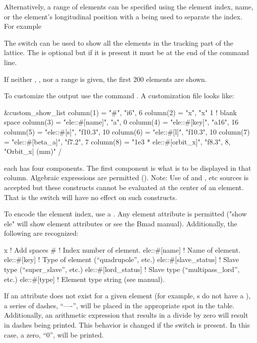 {{{\begin{description}
Alternatively, a range of elements can be specified using the element
index, name, or the element's longitudinal position with a  being
used to separate the index. For example
The  switch can be used to show all the elements
in the tracking part of the lattice. The
 is optional but if it is present it must be at the
end of the command line.

If neither , , nor a range is given,
the first 200 elements are shown.

To customize the output use the command . A customization file looks like:
\begin{example}
  &custom_show_list
    column(1) = "#",                     "i6",     6 
    column(2) = "x",                     "x"       1       ! blank space
    column(3) = "ele::#[name]",          "a",      0
    column(4) = "ele::#[key]",           "a16",   16
    column(5) = "ele::#[s]",             "f10.3", 10
    column(6) = "ele::#[l]",             "f10.3", 10
    column(7) = "ele::#[beta_a]",        "f7.2",   7
    column(8) = "1e3 * ele::#[orbit_x]", "f8.3",   8, "Orbit_x| (mm)" 
  /
\end{example}
each  has four components. The first component is what
is to be displayed in that column. Algebraic expressions are permitted
(). Note: Use of  and , etc
sources is accepted but these constructs cannot be evaluated at the
center of an element. That is the  switch will have no
effect on such constructs.

To encode the element index, use a \vn{\#}.
Any element attribute is permitted ("show ele" will show element
attributes or see the Bmad manual). Additionally, the following are
recognized:
\begin{example}
  x                          ! Add spaces
  #                          ! Index number of element.
  ele::#[name]                ! Name of element.
  ele::#[key]                 ! Type of element (``quadrupole'', etc.)
  ele::#[slave_status]        ! Slave type (``super_slave'', etc.)
  ele::#[lord_status]         ! Slave type (``multipass_lord'', etc.)
  ele::#[type]                ! Element type string (see \bmad manual).
\end{example}
If an attribute does not exist for a given element (for example,
s do not have a ), a series of dashes,
``----'', will be placed in the appropriate spot in the table.
Additionally, an arithmetic expression that results in a divide by
zero will result in dashes being printed. This behavior is changed if
the  switch is present. In this case, a zero, ``0'', will
be printed. 


\end{description}}}}
